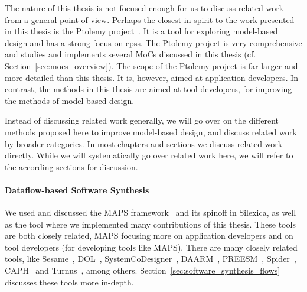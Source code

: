 The nature of this thesis is not focused enough for us to discuss related work from a general point of view.
Perhaps the closest in spirit to the work presented in this thesis is the Ptolemy project~\cite{Ptolemaeus:14:SystemDesign}.
It is a tool for exploring model-based design and has a strong focus on \acp{cps}.
The Ptolemy project is very comprehensive and studies and implements several \acp{MoC} discussed in this thesis (cf. Section~\ref{sec:mocs_overview}).
The scope of the Ptolemy project is far larger and more detailed than this thesis.
It is, however, aimed at application developers.
In contrast, the methods in this thesis are aimed at tool developers, for improving the methods of model-based design.

Instead of discussing related work generally, we will go over on the different methods proposed here to improve model-based design, and discuss related work by broader categories.
In most chapters and sections we discuss related work directly.
While we will systematically go over related work here, we will refer to the according sections for discussion.

\paragraph{Dataflow-based Software Synthesis}
We used and discussed the \ac{MAPS} framework~\cite{maps} and its spinoff in Silexica, as well as the \mocasin tool where we implemented many contributions of this thesis.
These tools are both closely related, \ac{MAPS} focusing more on application developers and \mocasin on tool developers (for developing tools like \ac{MAPS}).
There are many closely related tools, like Sesame~\cite{pimentel2006systematic}, DOL~\cite{thiele2007DOL}, SystemCoDesigner~\cite{haubelt2008systemcodesigner}, DAARM~\cite{weichslgartner2014daarm}, PREESM~\cite{pelcat2014preesm}, Spider~\cite{heulot2014spider}, CAPH~\cite{serot2013caph} and Turnus~\cite{casale2013turnus}, among others.
Section~\ref{sec:software_synthesis_flows} discusses these tools more in-depth.


